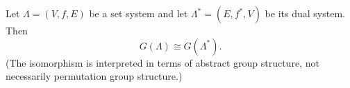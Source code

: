 Let $\Lambda = (V, f, E)$ be a set system and let $\Lambda^* = (E, f^*, V)$ be its dual system. Then
$$G(\Lambda) \cong G(\Lambda^*).$$
(The isomorphism is interpreted in terms of abstract group structure, not necessarily permutation group structure.)

